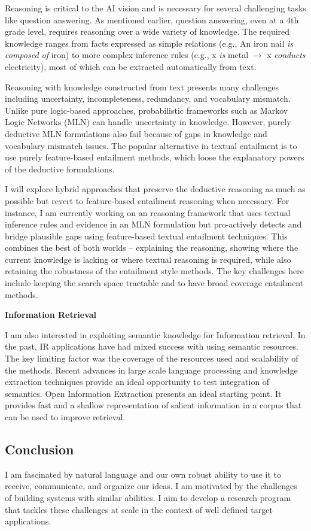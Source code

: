 \documentclass[a4paper,11pt,onecolumn]{article}
\begin{document}
Reasoning is critical to the AI vision and is necessary for several challenging tasks like question answering. As mentioned earlier, question answering, even at a 4th grade level, requires reasoning over a wide variety of knowledge. The required knowledge ranges from facts expressed as simple relations (e.g., {An iron nail {\em is composed of} iron}) to more complex inference rules (e.g., x {\em is} metal $\rightarrow$ x {\em conducts} electricity), most of which can be extracted automatically from text. 
 
Reasoning with knowledge constructed from text presents many challenges including uncertainty, incompleteness, redundancy, and vocabulary mismatch. 
Unlike pure logic-based approaches, probabilistic frameworks such as Markov Logic Networks (MLN) can handle uncertainty in knowledge.
However, purely deductive MLN formulations also fail because of gaps in knowledge and vocabulary mismatch issues. The popular alternative in textual entailment is to use purely feature-based entailment methods, which loose the explanatory powers of the deductive formulations. 

I will explore hybrid approaches that preserve the deductive reasoning as much as possible but revert to feature-based entailment reasoning when necessary. For instance, I am currently working on an reasoning framework that uses textual inference rules and evidence in an MLN formulation but pro-actively detects and bridge plausible gaps using feature-based textual entailment techniques. This combines the best of both worlds -- explaining the reasoning, showing where the current knowledge is lacking or where textual reasoning is required, while also retaining the robustness of the entailment style methods. The key challenges here include keeping the search space tractable and to have broad coverage entailment methods. 


{\bf Information Retrieval}

I am also interested in exploiting semantic knowledge for Information retrieval. In the past, IR applications have had mixed success with using semantic resources. The key limiting factor was the coverage of the resources used and scalability of the methods. Recent advances in large scale language processing and knowledge extraction techniques provide an ideal opportunity to test integration of semantics. Open Information Extraction presents an ideal starting point. It provides fast and a shallow representation of salient information in a corpus that can be used to improve retrieval. 

\subsection*{Conclusion}
I am fascinated by natural language and our own robust ability to use it to receive, communicate, and organize our ideas. I am motivated by the challenges of building systems with similar abilities. I aim to develop a research program that tackles these challenges at scale in the context of well defined target applications. 

{\small


}
\end{document}
